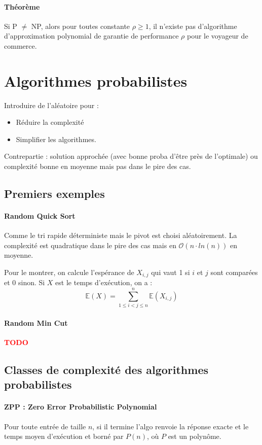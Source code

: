 \documentclass[french]{article}
\newcommand{\TODO}{\textcolor{red}{\textbf{TODO}}}
\begin{document}
\paragraph{Théorème} Si P $\neq$ NP, alors pour toutes constante $\rho \geq 1$, il n’existe pas d’algorithme d’approximation polynomial de garantie de performance $\rho$ pour le voyageur de commerce.




\section{Algorithmes probabilistes}

\noindent Introduire de l’aléatoire pour :
\begin{itemize}
\item Réduire la complexité
\item Simplifier les algorithmes.
\end{itemize}
Contrepartie : solution approchée (avec bonne proba d’être près de l’optimale) ou complexité bonne en moyenne mais pas dans le pire des cas.

\subsection{Premiers exemples}

\paragraph{Random Quick Sort} Comme le tri rapide déterministe mais le pivot est choisi aléatoirement. La complexité est quadratique dans le pire des cas mais en $\mathcal{O}(n \cdot ln(n))$ en moyenne.

Pour le montrer, on calcule l’espérance de $X_{i, j}$ qui vaut 1 si $i$ et $j$ sont comparées et $0$ sinon. Si $X$ est le temps d’exécution, on a :
\[\mathbb{E}(X) = \sum_{1 \leq i < j \leq n}^n \mathbb{E}(X_{i, j}) \]

\paragraph{Random Min Cut}

\TODO

\subsection{Classes de complexité des algorithmes probabilistes}

\paragraph{ZPP : Zero Error Probabilistic Polynomial} Pour toute entrée de taille $n$, si il termine l’algo renvoie la réponse exacte et le temps moyen d’exécution et borné par $P(n)$, où $P$ est un polynôme. 
\end{document}
